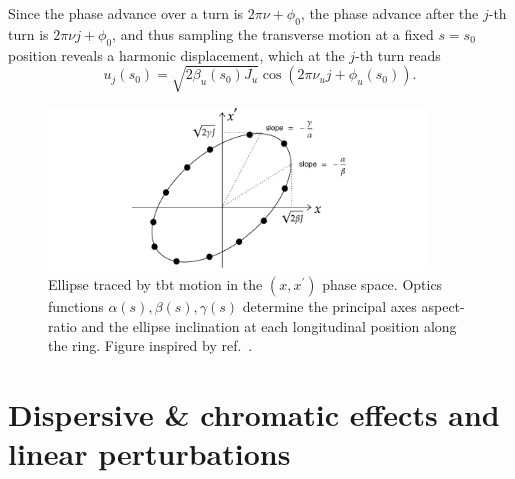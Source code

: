  Since the phase advance over a turn is $2\pi \nu+\phi_0$, the phase advance after the $j$-th turn is $2\pi\nu j+\phi_0$, and thus
 sampling the transverse motion at a fixed $s=s_0$ position reveals a harmonic displacement, which at the $j$-th turn reads
\begin{equation}
    u_j(s_0)=\sqrt{2\beta_u(s_0) J_u}\cos(2\pi\nu_u j+\phi_u(s_0)).
    \label{eq:TbT_motion}
\end{equation}
\begin{figure}[htb]
    \centering
    \includegraphics[width=0.9\textwidth]{Images/ellipse.pdf}
    \caption[Ellipse traced by TbT motion in the $(x,x^\prime)$ phase space.]{Ellipse traced by \gls*{tbt} motion in the $(x,x^\prime)$ phase space. Optics functions $\alpha(s), \beta(s), \gamma(s)$ determine the principal axes aspect-ratio and the ellipse inclination at each longitudinal position along the ring. Figure inspired by ref.~\cite{wolski_beam_2014}.}
    \label{fig:ellipse}
\end{figure}
\section{Dispersive \& chromatic effects and linear perturbations}
